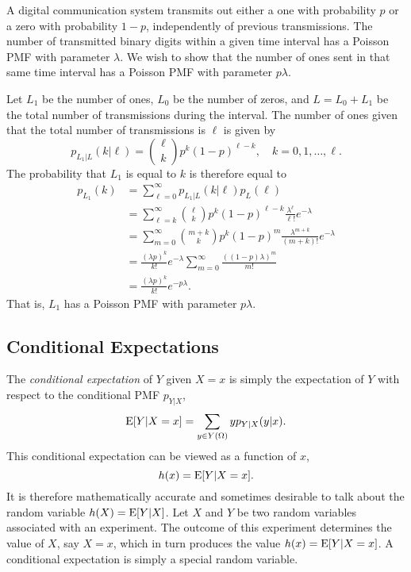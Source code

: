 \begin{example}
A digital communication system transmits out either a one with probability $p$ or a zero with probability $1 - p$, independently of previous transmissions.
The number of transmitted binary digits within a given time interval has a Poisson PMF with parameter $\lambda$.
We wish to show that the number of ones sent in that same time interval has a Poisson PMF with parameter $p \lambda$.

Let $L_1$ be the number of ones, $L_0$ be the number of zeros, and $L = L_0 + L_
1$ be the total number of transmissions during the interval.
The number of ones given that the total number of transmissions is $\ell$ is given by
\begin{equation*}
p_{L_1|L} (k | \ell) = \binom{\ell}{k} p^k (1-p)^{\ell - k},
\quad k = 0, 1, \ldots, \ell.
\end{equation*}
The probability that $L_1$ is equal to $k$ is therefore equal to
\begin{equation*}
\begin{split}
p_{L_1} (k) &= \sum_{\ell = 0}^{\infty} p_{L_1|L} (k | \ell) p_L(\ell) \\
&= \sum_{\ell = k}^{\infty} \binom{\ell}{k} p^k (1-p)^{\ell - k}
\frac{\lambda^{\ell}}{\ell !} e^{-\lambda} \\
&= \sum_{m = 0}^{\infty} \binom{m+k}{k} p^k (1-p)^{m}
\frac{\lambda^{m+k}}{(m+k)!} e^{-\lambda} \\
&= \frac{(\lambda p)^k}{k!} e^{-\lambda}
\sum_{m = 0}^{\infty} \frac{( (1-p) \lambda)^{m}}{m!} \\
&= \frac{(\lambda p)^k}{k!} e^{-p \lambda} .
\end{split}
\end{equation*}
That is, $L_1$ has a Poisson PMF with parameter $p \lambda$.
\end{example}


\subsection{Conditional Expectations}

The \emph{conditional expectation} of $Y$ given $X = x$ is simply the expectation of $Y$ with respect to the conditional PMF $p_{Y|X}$,
\begin{equation*}
\mathrm{E} [Y | X = x ] = \sum_{y \in Y(\Omega)} y p_{Y|X} (y|x).
\end{equation*}
This conditional expectation can be viewed as a function of $x$,
\begin{equation*}
h(x) = \mathrm{E} [Y | X = x] .
\end{equation*}
It is therefore mathematically accurate and sometimes desirable to talk about the random variable $h (X) = \mathrm{E} [Y | X]$.
Let $X$ and $Y$ be two random variables associated with an experiment.
The outcome of this experiment determines the value of $X$, say $X = x$, which in turn produces the value $h(x) = \mathrm{E} [Y | X = x]$.
A conditional expectation is simply a special random variable.

